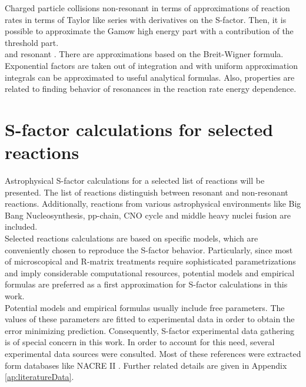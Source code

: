 \documentclass[openany]{book}
\begin{document}
Charged particle collisions non-resonant \cite{ueda_sargeant_pato_hussein_2002} in terms of approximations of reaction rates in terms of Taylor like series with derivatives on the S-factor.  Then, it is possible to approximate the Gamow high energy part with a contribution of the threshold part.  \\

 and resonant \cite{ueda_sargeant_pato_hussein_2004}. There are approximations based on the Breit-Wigner formula. Exponential factors are taken out of integration and with uniform approximation integrals can be approximated to useful analytical formulas. Also, properties are related to finding behavior of resonances in the reaction rate energy dependence.  \\


\chapter{S-factor calculations for selected reactions} \label{ch:sfactorCalculations}

Astrophysical S-factor calculations for a selected list of reactions will be presented. The list of reactions distinguish between resonant and non-resonant reactions. Additionally, reactions from various astrophysical environments like Big Bang Nucleosynthesis, pp-chain, CNO cycle and middle heavy nuclei fusion are included.  \\

Selected reactions calculations are based on specific models, which are conveniently chosen to reproduce the S-factor behavior. Particularly, since most of microscopical and R-matrix treatments require sophisticated parametrizations and imply considerable computational resources, potential models and empirical formulas are preferred as a first approximation for S-factor calculations in this work.  \\

Potential models and empirical formulas usually include free parameters. The values of these parameters are fitted to experimental data in order to obtain the error minimizing prediction. Consequently, S-factor experimental data gathering is of special concern in this work. In order to account for this need, several experimental data sources were consulted. Most of these references were extracted form databases like NACRE II \cite{xu_takahashi_goriely_arnould_ohta_utsunomiya_2013}. Further related details are given in Appendix \ref{ap:literatureData}. \\ 
\end{document}
